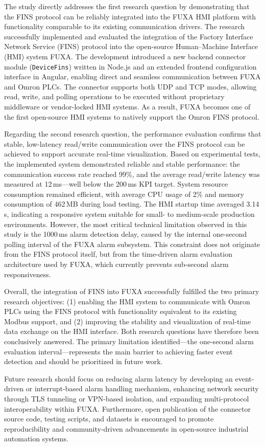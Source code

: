 The study directly addresses the first research question by demonstrating that the FINS protocol can be reliably integrated into the FUXA HMI platform with functionality comparable to its existing communication drivers. The research successfully implemented and evaluated the integration of the Factory Interface Network Service (FINS) protocol into the open-source Human--Machine Interface (HMI) system FUXA. The development introduced a new backend connector module (\texttt{DeviceFins}) written in Node.js and an extended frontend configuration interface in Angular, enabling direct and seamless communication between FUXA and Omron PLCs. The connector supports both UDP and TCP modes, allowing read, write, and polling operations to be executed without proprietary middleware or vendor-locked HMI systems. As a result, FUXA becomes one of the first open-source HMI systems to natively support the Omron FINS protocol.

Regarding the second research question, the performance evaluation confirms that stable, low-latency read/write communication over the FINS protocol can be achieved to support accurate real-time visualization. Based on experimental tests, the implemented system demonstrated reliable and stable performance: the communication success rate reached 99\%, and the average read/write latency was measured at 12\,ms---well below the 200\,ms KPI target. System resource consumption remained efficient, with average CPU usage of 2\% and memory consumption of 462\,MB during load testing. The HMI startup time averaged 3.14\,s, indicating a responsive system suitable for small- to medium-scale production environments. However, the most critical technical limitation observed in this study is the 1000\,ms alarm detection delay, caused by the internal one-second polling interval of the FUXA alarm subsystem. This constraint does not originate from the FINS protocol itself, but from the time-driven alarm evaluation architecture used by FUXA, which currently prevents sub-second alarm responsiveness.

Overall, the integration of FINS into FUXA successfully fulfilled the two primary research objectives: (1) enabling the HMI system to communicate with Omron PLCs using the FINS protocol with functionality equivalent to its existing Modbus support, and (2) improving the stability and visualization of real-time data exchange on the HMI interface. Both research questions have therefore been conclusively answered. The primary limitation identified---the one-second alarm evaluation interval---represents the main barrier to achieving faster event detection and should be prioritized in future work.

Future research should focus on reducing alarm latency by developing an event-driven or interrupt-based alarm handling mechanism, enhancing network security through TLS tunneling or VPN-based isolation, and expanding multi-protocol interoperability within FUXA. Furthermore, open publication of the connector source code, testing scripts, and datasets is encouraged to promote reproducibility and community-driven advancements in open-source industrial automation systems.
